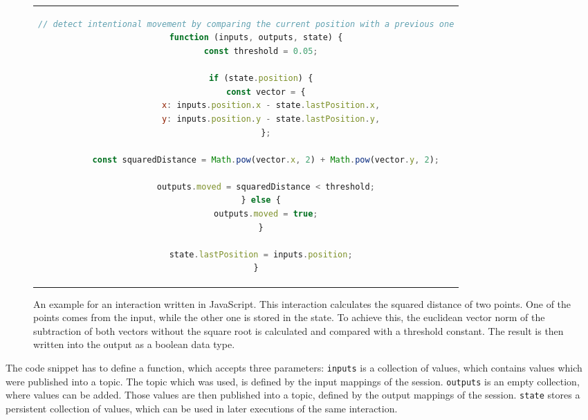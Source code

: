 \begin{figure}[H]
  \centering
  \begin{tabular}{c}
  \begin{lstlisting}[language=JavaScript]
    // detect intentional movement by comparing the current position with a previous one
    function (inputs, outputs, state) {
      const threshold = 0.05;

      if (state.position) {
        const vector = {
          x: inputs.position.x - state.lastPosition.x,
          y: inputs.position.y - state.lastPosition.y,
        };
  
        const squaredDistance = Math.pow(vector.x, 2) + Math.pow(vector.y, 2);
  
        outputs.moved = squaredDistance < threshold;
      } else {
        outputs.moved = true;
      }

      state.lastPosition = inputs.position;
    }
  \end{lstlisting}
  \end{tabular}
  \caption[A basic UBII interaction in JavaScript.]{An example for an interaction written in JavaScript. This interaction calculates the squared distance of two points. One of the points comes from the input, while the other one is stored in the state. To achieve this, the euclidean vector norm of the subtraction of both vectors without the square root is calculated and compared with a threshold constant. The result is then written into the output as a boolean data type.}\label{fig:ubii_interaction_example}
\end{figure}

The code snippet has to define a function, which accepts three parameters: 
\lstinline{inputs} is a collection of values, which contains values which were published into a topic. The topic which was used, is defined by the input mappings of the session. \lstinline{outputs} is an empty collection, where values can be added. Those values are then published into a topic, defined by the output mappings of the session. \lstinline{state} stores a persistent collection of values, which can be used in later executions of the same interaction.